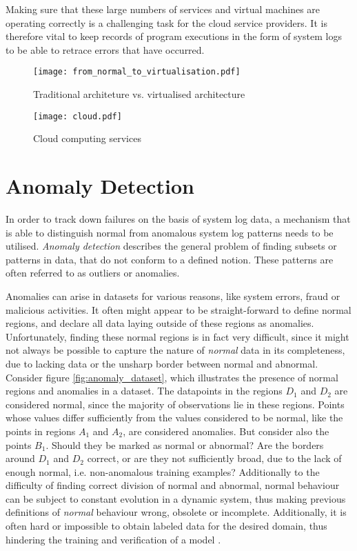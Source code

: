 Making sure that these large numbers of services and virtual machines are operating correctly is a challenging task for the cloud service providers. It is therefore vital to keep records of program executions in the form of system logs to be able to retrace errors that have occurred.

\begin{figure}[h]
  \centering
  \texttt{[image: from\_normal\_to\_virtualisation.pdf]}\\
  \caption{Traditional architeture vs. virtualised architecture}
  \label{fig:virtualisation}
\end{figure}

\begin{figure}[H]
  \centering
  \texttt{[image: cloud.pdf]}\\
  \caption{Cloud computing services}
  \label{fig:cloud}
\end{figure}


\section{Anomaly Detection \label{sec:anomaly-detection}}
In order to track down failures on the basis of system log data, a mechanism that is able to distinguish normal from anomalous system log patterns needs to be utilised.
\textit{Anomaly detection} describes the general problem of finding subsets or patterns in data, that do not conform to a defined notion. These patterns are often referred to as outliers or anomalies.

Anomalies can arise in datasets for various reasons, like system errors, fraud or malicious activities. It often might appear to be straight-forward to define normal regions, and declare all data laying outside of these regions as anomalies. Unfortunately, finding these normal regions is in fact very difficult, since it might not always be possible to capture the nature of \textit{normal} data in its completeness, due to lacking data or the unsharp border between normal and abnormal. Consider figure \ref{fig:anomaly_dataset}, which illustrates the presence of normal regions and anomalies in a dataset. The datapoints in the regions $D_1$ and $D_2$ are considered normal, since the majority of observations lie in these regions. Points whose values differ sufficiently from the values considered to be normal, like the points in regions $A_1$ and $A_2$, are considered anomalies. But consider also the points $B_1$. Should they be marked as normal or abnormal? Are the borders around $D_1$ and $D_2$ correct, or are they not sufficiently broad, due to the lack of enough normal, i.e. non-anomalous training examples? 
Additionally to the difficulty of finding correct division of normal and abnormal, normal behaviour can be subject to constant evolution in a dynamic system, thus making previous definitions of \textit{normal} behaviour wrong, obsolete or incomplete. Additionally, it is often hard or impossible to obtain labeled data for the desired domain, thus hindering the training and verification of a model \cite{chandola2009anomaly}.

